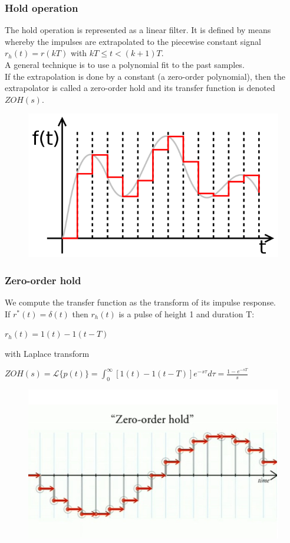 \begin{frame}
	\frametitle{Hold operation}
	The hold operation is represented as a linear filter. It is defined by means whereby the impulses are extrapolated to the piecewise constant signal $r_h(t) = r(kT)$ with $kT \leq t < (k+1)T$.\\
	\medskip
	A general technique is to use a polynomial fit to the past samples.\\
	If the extrapolation is done by a constant (a zero-order polynomial), then the extrapolator is called a zero-order hold and its transfer function is denoted $ZOH(s)$. 
	\begin{figure}
		\includegraphics[width=0.55\linewidth]{sample_and_hold}
	\end{figure}
\end{frame}

\begin{frame}
	\frametitle{Zero-order hold}
	We compute the transfer function as the transform of its impulse response. \\
	\medskip
	If $r^*(t)=\delta(t)$ then $r_h(t)$ is a pulse of height 1 and duration T:\\
	\begin{center}
		$r_h(t) = 1(t) - 1(t-T)$\\
	\end{center}
	with Laplace transform\\
	\begin{center}
		$ZOH(s)=\mathcal{L}\{p(t)\} = \int_{0}^{\infty} [1(t)-1(t-T)]e^{-s\tau}d\tau = \frac{1-e^{-sT}}{s}$
	\end{center}
	\begin{figure}
		\includegraphics[width=0.5\linewidth]{zoh}
	\end{figure}
\end{frame}


